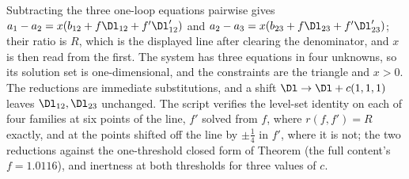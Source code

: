 Subtracting the three one-loop equations pairwise gives $a_{1} - a_{2} = x(b_{12} + f\Dl_{12} + f'\Dl'_{12})$ and $a_{2} - a_{3} = x(b_{23} + f\Dl_{23} + f'\Dl'_{23})$; their ratio is $R$, which is the displayed line after clearing the denominator, and $x$ is then read from the first. The system has three equations in four unknowns, so its solution set is one-dimensional, and the constraints are the triangle and $x > 0$. The reductions are immediate substitutions, and a shift $\Dl \to \Dl + c(1,1,1)$ leaves $\Dl_{12}, \Dl_{23}$ unchanged. The script verifies the level-set identity on each of four families at six points of the line, $f'$ solved from $f$, where $r(f, f') = R$ exactly, and at the points shifted off the line by $\pm\tfrac14$ in $f'$, where it is not; the two reductions against the one-threshold closed form of Theorem  (the full content's $f = 1.0116$), and inertness at both thresholds for three values of $c$.
